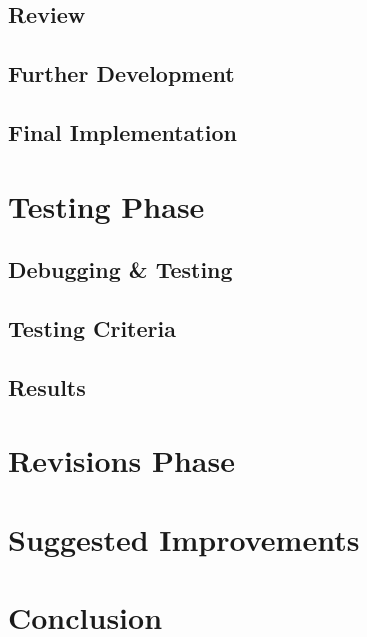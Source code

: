 \documentclass{article}
\begin{document}
\subsection{Review}
\subsection{Further Development}
\subsection{Final Implementation}

\newpage
\section{Testing Phase}
\subsection{Debugging \& Testing}
\subsection{Testing Criteria}
\subsection{Results}

\newpage
\section{Revisions Phase}

\newpage
\section{Suggested Improvements}

\newpage
\section{Conclusion}

\newpage


\end{document}
